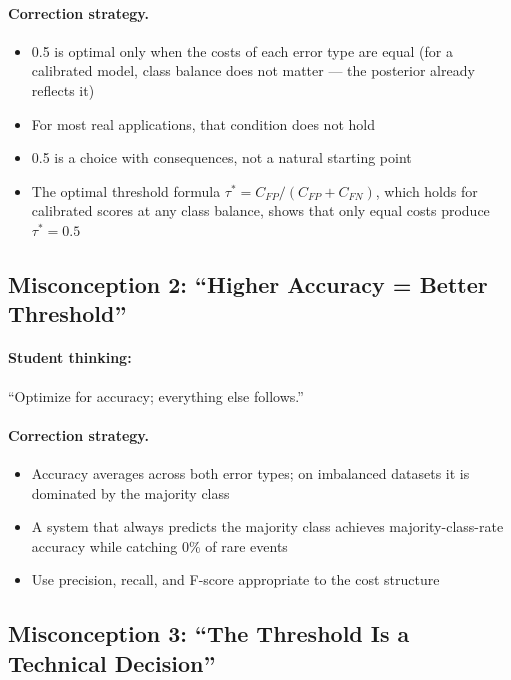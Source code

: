 \paragraph{Correction strategy.}
\begin{itemize}
    \item 0.5 is optimal only when the costs of each error type are equal (for a calibrated model, class balance does not matter --- the posterior already reflects it)
    \item For most real applications, that condition does not hold
    \item 0.5 is a choice with consequences, not a natural starting point
    \item The optimal threshold formula $\tau^* = C_{FP} / (C_{FP} + C_{FN})$, which holds for calibrated scores at any class balance, shows that only equal costs produce $\tau^* = 0.5$
\end{itemize}

\subsection{Misconception 2: ``Higher Accuracy = Better Threshold''}

\paragraph{Student thinking:} ``Optimize for accuracy; everything else follows.''

\paragraph{Correction strategy.}
\begin{itemize}
    \item Accuracy averages across both error types; on imbalanced datasets it is dominated by the majority class
    \item A system that always predicts the majority class achieves majority-class-rate accuracy while catching 0\% of rare events
    \item Use precision, recall, and F-score appropriate to the cost structure
\end{itemize}

\subsection{Misconception 3: ``The Threshold Is a Technical Decision''}

